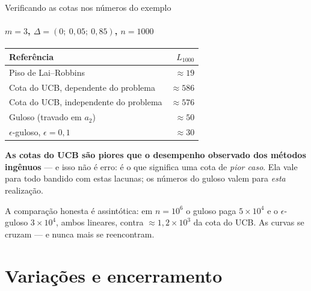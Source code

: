 \documentclass[aspectratio=169, 10pt]{beamer}
\newcommand{\gap}{\Delta}
\newcommand{\Reg}{L}
\begin{document}
\begin{frame}{Verificando as cotas nos números do exemplo}
  \framesubtitle{$m = 3$, $\gap = (0;\ 0{,}05;\ 0{,}85)$, $n = 1000$}

  \centering\small
  \begin{tabular}{lr}
    \toprule
    \textbf{Referência} & $\Reg_{1000}$ \\
    \midrule
    Piso de Lai--Robbins & $\approx 19$ \\
    Cota do UCB, dependente do problema & $\approx 586$ \\
    Cota do UCB, independente do problema & $\approx 576$ \\
    Guloso (travado em $a_2$) & $\approx 50$ \\
    $\epsilon$-guloso, $\epsilon = 0{,}1$ & $\approx 30$ \\
    \bottomrule
  \end{tabular}

  \vspace{0.8em}
  \begin{alertabox}[fontupper=\footnotesize]
    \textbf{As cotas do UCB são piores que o desempenho observado dos
    métodos ingênuos} --- e isso não é erro: é o que significa uma cota de
    \emph{pior caso}. Ela vale para todo bandido com estas lacunas; os
    números do guloso valem para \emph{esta} realização.
  \end{alertabox}
  \begin{ideiabox}[fontupper=\footnotesize]
    A comparação honesta é assintótica: em $n = 10^6$ o guloso paga
    $5\times10^4$ e o $\epsilon$-guloso $3\times10^4$, ambos lineares,
    contra $\approx 1{,}2\times10^3$ da cota do UCB. As curvas se cruzam ---
    e nunca mais se reencontram.
  \end{ideiabox}
\end{frame}

\section{Variações e encerramento}
\end{document}
